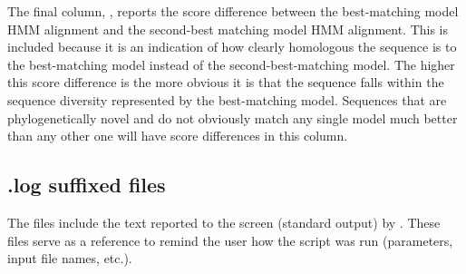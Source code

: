 The final column, , reports the score difference between
the best-matching model HMM alignment and the second-best matching
model HMM alignment. This is included because it is an indication of
how clearly homologous the sequence is to the best-matching model
instead of the second-best-matching model. The higher this score
difference is the more obvious it is that the sequence falls within
the sequence diversity represented by the best-matching model.
Sequences that are phylogenetically novel and do not obviously match
any single model much better than any other one will have score
differences in this column.

\subsection{.log suffixed files}

The  files include the text reported to the screen
(standard output) by . These files serve as a
reference to remind the user how the  script was run
(parameters, input file names, etc.). 



